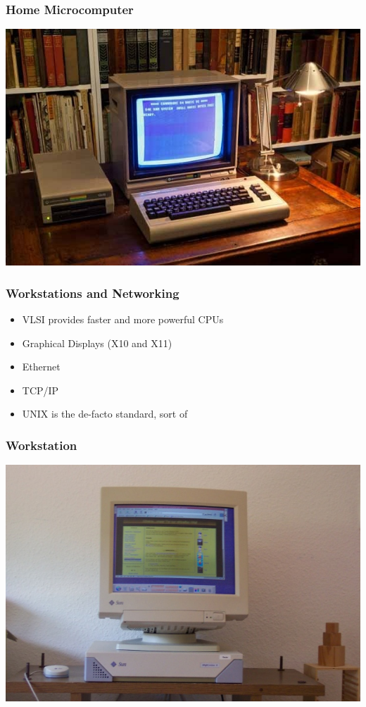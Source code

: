 \documentclass[pdftex]{beamer} %
\begin{document}
\begin{frame}
  \frametitle{Home Microcomputer}
  \centering
  \includegraphics[width=\textwidth]{../../figures/c64.jpg}  
\end{frame}

\begin{frame}
  \frametitle{Workstations and Networking}
  \begin{itemize}
  \item VLSI provides faster and more powerful CPUs
  \item Graphical Displays (X10 and X11)
  \item Ethernet
  \item TCP/IP
  \item UNIX is the de-facto standard, sort of
  \end{itemize}
\end{frame}

\begin{frame}
  \frametitle{Workstation}
  \centering
  \includegraphics[width=\textwidth]{../../figures/workstation.jpg}  
\end{frame}
\end{document}

